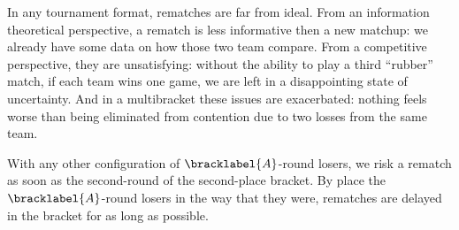 {    In any tournament format, rematches are far from ideal. From an information theoretical perspective, a rematch is less informative then a new matchup: we already have some data on how those two team compare. From a competitive perspective, they are unsatisfying: without the ability to play a third ``rubber'' match, if each team wins one game, we are left in a disappointing state of uncertainty. And in a multibracket these issues are exacerbated: nothing feels worse than being eliminated from contention due to two losses from the same team.

    With any other configuration of $\bracklabel{A}$-round losers, we risk a rematch as soon as the second-round of the second-place bracket. By place the $\bracklabel{A}$-round losers in the way that they were, rematches are delayed in the bracket for as long as possible.    

}